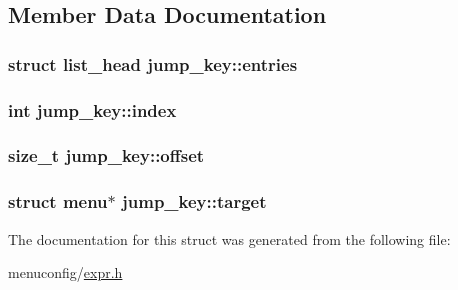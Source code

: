 \subsection{Member Data Documentation}
\hypertarget{structjump__key_a9bdbad4d76b3598a85f8e77e3fb9beb3}{
\subsubsection[{entries}]{\setlength{\rightskip}{0pt plus 5cm}struct {\bf list\-\_\-head} jump\-\_\-key\-::entries}}\label{structjump__key_a9bdbad4d76b3598a85f8e77e3fb9beb3}
\hypertarget{structjump__key_a645e4d52a06ead5e69721e2bc497cadb}{
\subsubsection[{index}]{\setlength{\rightskip}{0pt plus 5cm}int jump\-\_\-key\-::index}}\label{structjump__key_a645e4d52a06ead5e69721e2bc497cadb}
\hypertarget{structjump__key_ac8f8f1fabe5c4ec156ef259c76176033}{
\subsubsection[{offset}]{\setlength{\rightskip}{0pt plus 5cm}size\-\_\-t jump\-\_\-key\-::offset}}\label{structjump__key_ac8f8f1fabe5c4ec156ef259c76176033}
\hypertarget{structjump__key_a59b28c613aacd74084afc7bc35da4d3b}{
\subsubsection[{target}]{\setlength{\rightskip}{0pt plus 5cm}struct {\bf menu}$\ast$ jump\-\_\-key\-::target}}\label{structjump__key_a59b28c613aacd74084afc7bc35da4d3b}


The documentation for this struct was generated from the following file\-:\begin{DoxyCompactItemize}
\item 
menuconfig/\hyperlink{expr_8h}{expr.\-h}\end{DoxyCompactItemize}
